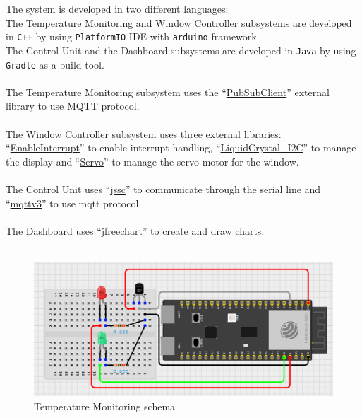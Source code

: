 \documentclass[a4paper,12pt]{report}
\begin{document}
    The system is developed in two different languages:\\
    The Temperature Monitoring and Window Controller subsystems are developed in \texttt{C++} by using \texttt{PlatformIO} IDE with 
    \texttt{arduino} framework.\\
    The Control Unit and the Dashboard subsystems are developed in \texttt{Java} by using \texttt{Gradle} as a build tool.\\\\
    The Temperature Monitoring subsystem uses the ``\href{https://github.com/knolleary/pubsubclient}{PubSubClient}'' external library 
    to use MQTT protocol.\\\\
    The Window Controller subsystem uses three external libraries: ``\href{https://github.com/GreyGnome/EnableInterrupt}{EnableInterrupt}'' 
    to enable interrupt handling, 
    ``\href{https://github.com/johnrickman/LiquidCrystal_I2C}{LiquidCrystal\_I2C}'' to manage the display and 
    ``\href{https://docs.arduino.cc/libraries/servo/}{Servo}'' to manage the servo motor for the window.\\\\
    The Control Unit uses ``\href{https://mvnrepository.com/artifact/io.github.java-native/jssc/2.9.6}{jssc}'' to communicate through 
    the serial line and ``\href{https://mvnrepository.com/artifact/org.eclipse.paho/org.eclipse.paho.client.mqttv3/1.2.5}{mqttv3}'' 
    to use mqtt protocol.\\\\
    The Dashboard uses ``\href{https://mvnrepository.com/artifact/org.jfree/jfreechart/1.5.0}{jfreechart}'' to create and draw charts.\\\\

    \begin{figure}[H]
        \centering{}
            \includegraphics[width=\textwidth]{report/img/Assignment-03_SMT-Temperature-Subsystem.png}
        \caption{Temperature Monitoring schema}
        \label{img:temperature_schema}
    \end{figure}
\end{document}
